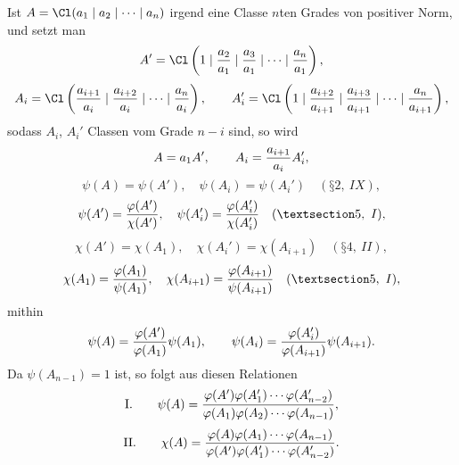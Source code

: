 Ist $A=\Cl(a_1\mid a_2\mid\cdots\mid a_n)$ irgend eine Classe $n$ten Grades von positiver Norm, und setzt man
\[
 A'=\Cl\left(1\mid {a_2\over a_1}\mid {a_3\over a_1}\mid\cdots\mid {a_n\over a_1}\right),
\]
\[
 A_i=\Cl\left({a_{i+1}\over a_i}\mid {a_{i+2}\over a_i}\mid\cdots\mid {a_n\over a_i}\right),
\qquad
 A_i'=\Cl\left(1\mid {a_{i+2}\over a_{i+1}}\mid {a_{i+3}\over a_{i+1}}\mid\cdots\mid {a_n\over a_{i+1}}\right),
\]
sodass $A_i$, $A_i'$ Classen vom Grade $n-i$ sind, so wird
\[
 A=a_1A',\qquad A_i={a_{i+1}\over a_i}A_i',
\]
\[
 \psi(A)=\psi(A'),\quad \psi(A_i)=\psi(A_i')\quad (§ 2,\ IX),
\]
\[
 \psi(A')={\varphi(A')\over\chi(A')},\quad
 \psi(A_i')={\varphi(A_i')\over\chi(A_i')}\quad (§ 5,\ I),
\]
\[
 \chi(A')=\chi(A_1),\quad \chi(A_i')=\chi(A_{i+1})\quad (§ 4,\ II),
\]
\[
 \chi(A_1)={\varphi(A_1)\over\psi(A_1)},\quad
 \chi(A_{i+1})={\varphi(A_{i+1})\over\psi(A_{i+1})}\quad (§ 5,\ I),
\]
mithin
\[
 \psi(A)={\varphi(A')\over\varphi(A_1)}\psi(A_1),
 \qquad
 \psi(A_i)={\varphi(A_i')\over\varphi(A_{i+1})}\psi(A_{i+1}).
\]
Da $\psi(A_{n-1})=1$ ist, so folgt aus diesen Relationen
\[
\text{I.}\qquad
 \psi(A)={\varphi(A')\varphi(A_1')\cdots\varphi(A_{n-2}')
 \over
 \varphi(A_1)\varphi(A_2)\cdots\varphi(A_{n-1})},
\]
\[
\text{II.}\qquad
 \chi(A)={\varphi(A)\varphi(A_1)\cdots\varphi(A_{n-1})
 \over
 \varphi(A')\varphi(A_1')\cdots\varphi(A_{n-2}')}.
\]

